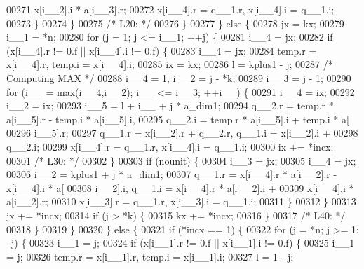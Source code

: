 \begin{DoxyCode}
00271                     x[i\_\_2].i * a[i\_\_3].r;
00272                 x[i\_\_4].r = q\_\_1.r, x[i\_\_4].i = q\_\_1.i;
00273             \}
00274             \}
00275 \textcolor{comment}{/* L20: */}
00276         \}
00277         \} \textcolor{keywordflow}{else} \{
00278         jx = kx;
00279         i\_\_1 = *n;
00280         \textcolor{keywordflow}{for} (j = 1; j <= i\_\_1; ++j) \{
00281             i\_\_4 = jx;
00282             \textcolor{keywordflow}{if} (x[i\_\_4].r != 0.f || x[i\_\_4].i != 0.f) \{
00283             i\_\_4 = jx;
00284             temp.r = x[i\_\_4].r, temp.i = x[i\_\_4].i;
00285             ix = kx;
00286             l = kplus1 - j;
00287 \textcolor{comment}{/* Computing MAX */}
00288             i\_\_4 = 1, i\_\_2 = j - *k;
00289             i\_\_3 = j - 1;
00290             \textcolor{keywordflow}{for} (i\_\_ = max(i\_\_4,i\_\_2); i\_\_ <= i\_\_3; ++i\_\_) \{
00291                 i\_\_4 = ix;
00292                 i\_\_2 = ix;
00293                 i\_\_5 = l + i\_\_ + j * a\_dim1;
00294                 q\_\_2.r = temp.r * a[i\_\_5].r - temp.i * a[i\_\_5].i, 
00295                     q\_\_2.i = temp.r * a[i\_\_5].i + temp.i * a[
00296                     i\_\_5].r;
00297                 q\_\_1.r = x[i\_\_2].r + q\_\_2.r, q\_\_1.i = x[i\_\_2].i + 
00298                     q\_\_2.i;
00299                 x[i\_\_4].r = q\_\_1.r, x[i\_\_4].i = q\_\_1.i;
00300                 ix += *incx;
00301 \textcolor{comment}{/* L30: */}
00302             \}
00303             \textcolor{keywordflow}{if} (nounit) \{
00304                 i\_\_3 = jx;
00305                 i\_\_4 = jx;
00306                 i\_\_2 = kplus1 + j * a\_dim1;
00307                 q\_\_1.r = x[i\_\_4].r * a[i\_\_2].r - x[i\_\_4].i * a[
00308                     i\_\_2].i, q\_\_1.i = x[i\_\_4].r * a[i\_\_2].i + 
00309                     x[i\_\_4].i * a[i\_\_2].r;
00310                 x[i\_\_3].r = q\_\_1.r, x[i\_\_3].i = q\_\_1.i;
00311             \}
00312             \}
00313             jx += *incx;
00314             \textcolor{keywordflow}{if} (j > *k) \{
00315             kx += *incx;
00316             \}
00317 \textcolor{comment}{/* L40: */}
00318         \}
00319         \}
00320     \} \textcolor{keywordflow}{else} \{
00321         \textcolor{keywordflow}{if} (*incx == 1) \{
00322         \textcolor{keywordflow}{for} (j = *n; j >= 1; --j) \{
00323             i\_\_1 = j;
00324             \textcolor{keywordflow}{if} (x[i\_\_1].r != 0.f || x[i\_\_1].i != 0.f) \{
00325             i\_\_1 = j;
00326             temp.r = x[i\_\_1].r, temp.i = x[i\_\_1].i;
00327             l = 1 - j;

\end{DoxyCode}
